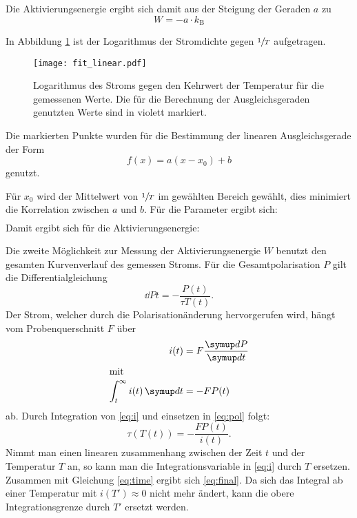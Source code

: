 Die Aktivierungsenergie ergibt sich damit aus der Steigung der Geraden $a$ zu
\begin{equation}
  W = - a \cdot k_\mathrm{B}
\end{equation}

In Abbildung \ref{fig:lnj} ist der Logarithmus der Stromdichte gegen $\sfrac{1}{T}$ aufgetragen.

\begin{figure}
  \texttt{[image: fit\_linear.pdf]}
  \caption{%
    Logarithmus des Stroms gegen den Kehrwert der Temperatur für die gemessenen Werte.
    Die für die Berechnung der Ausgleichsgeraden genutzten Werte sind in violett markiert.
  }
  \label{fig:lnj}
\end{figure}

Die markierten Punkte wurden für die Bestimmung der linearen Ausgleichsgerade der Form
\begin{equation}
  f(x) = a (x - x_0) + b
\end{equation}
genutzt.

Für $x_0$ wird der Mittelwert von $\sfrac{1}{T}$ im gewählten Bereich gewählt, dies minimiert die Korrelation zwischen $a$ und $b$.
Für die Parameter ergibt sich:
\begin{align}
  
\end{align}
Damit ergibt sich für die Aktivierungsenergie:
\begin{equation}
  
\end{equation}


Die zweite Möglichkeit zur Messung der Aktivierungsenergie $W$ benutzt den gesamten Kurvenverlauf des gemessen Stroms.
Für die Gesamtpolarisation $P$ gilt die Differentialgleichung
\begin{equation}
  \dd{P}{t} = - \frac{P(t)}{\tau{T(t)}}.
  \label{eq:pol}
\end{equation}
Der Strom, welcher durch die Polarisationänderung hervorgerufen wird, hängt vom Probenquerschnitt $F$ über
\begin{align}
  i(t) &= F \dd{P}{t} \\
  \shortintertext{mit}
  \int_t^{\infty} i(t) \dif{t} &= -FP(t)
  \label{eq:i}
\end{align}
ab.
Durch Integration von  \eqref{eq:i} und einsetzen in \eqref{eq:pol} folgt:
\begin{equation}
  \tau(T(t)) = -\frac{F P(t)}{i(t)}.
  \label{eq:tau_t}
\end{equation}
Nimmt man einen linearen zusammenhang zwischen der Zeit $t$ und der Temperatur $T$ an, so kann man die Integrationsvariable in \eqref{eq:i} durch $T$ ersetzen.
Zusammen mit Gleichung \eqref{eq:time} ergibt sich \eqref{eq:final}. Da sich das Integral ab einer Temperatur mit $i(T') \approx 0$ nicht mehr ändert,
kann die obere Integrationsgrenze durch $T'$ ersetzt werden.

